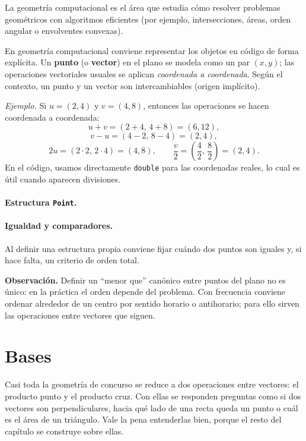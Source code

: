 La geometría computacional es el área que estudia cómo resolver problemas geométricos con algoritmos eficientes (por ejemplo, intersecciones, áreas, orden angular o envolventes convexas).

En geometría computacional conviene representar los objetos en código de forma explícita. Un \textbf{punto} (o \textbf{vector}) en el plano se modela como un par $(x,y)$; las operaciones vectoriales usuales se aplican \emph{coordenada a coordenada}. Según el contexto, un punto y un vector son intercambiables (origen implícito).

\textit{Ejemplo.} Si $u=(2,4)$ y $v=(4,8)$, entonces las operaciones se hacen coordenada a coordenada:
\[
u+v=(2+4,\,4+8)=(6,12),
\]
\[
v-u=(4-2,\,8-4)=(2,4),
\]
\[
2u=(2\cdot 2,\,2\cdot 4)=(4,8),\qquad \frac{v}{2}=\left(\frac{4}{2},\,\frac{8}{2}\right)=(2,4).
\]
En el código, usamos directamente \verb|double| para las coordenadas reales, lo cual es útil cuando aparecen divisiones.

\paragraph{Estructura \texttt{Point}.}



\paragraph{Igualdad y comparadores.}

Al definir una estructura propia conviene fijar cuándo dos puntos son iguales y, si hace falta, un criterio de orden total.



\textbf{Observación.} Definir un ``menor que'' canónico entre puntos del plano no es único: en la práctica el orden depende del problema. Con frecuencia conviene ordenar alrededor de un centro por sentido horario o antihorario; para ello sirven las operaciones entre vectores que siguen.

\section{Bases}

Casi toda la geometría de concurso se reduce a dos operaciones entre vectores: el producto punto y el producto cruz. Con ellas se responden preguntas como si dos vectores son perpendiculares, hacia qué lado de una recta queda un punto o cuál es el área de un triángulo. Vale la pena entenderlas bien, porque el resto del capítulo se construye sobre ellas.

